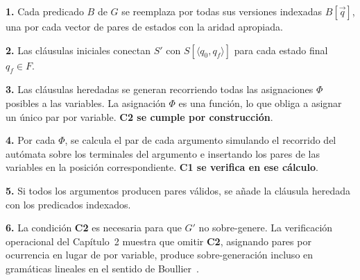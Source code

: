 \documentclass[11pt, letterpaper]{article}
\theoremstyle{definition}
\newcommand{\pair}[2]{\langle #1, #2 \rangle}
\begin{document}
\begin{tcolorbox}
\textbf{1.} Cada predicado $B$ de $G$ se reemplaza por todas sus versiones indexadas $B[\vec{q}]$, una por cada vector de pares de estados con la aridad apropiada. \medskip

\textbf{2.} Las cláusulas iniciales conectan $S'$ con $S[\pair{q_0}{q_f}]$ para cada estado final $q_f \in F$. \medskip

\textbf{3.} Las cláusulas heredadas se generan recorriendo todas las asignaciones $\Phi$ posibles a las variables. La asignación $\Phi$ es una función, lo que obliga a asignar un único par por variable. \textbf{C2 se cumple por construcción}. \medskip

\textbf{4.} Por cada $\Phi$, se calcula el par de cada argumento simulando el recorrido del autómata sobre los terminales del argumento e insertando los pares de las variables en la posición correspondiente. \textbf{C1 se verifica en ese cálculo}. \medskip

\textbf{5.} Si todos los argumentos producen pares válidos, se añade la cláusula heredada con los predicados indexados. \medskip

\textbf{6.} La condición \textbf{C2} es necesaria para que $G'$ no sobre-genere. La verificación operacional del Capítulo~2 muestra que omitir \textbf{C2}, asignando pares por ocurrencia en lugar de por variable, produce sobre-generación incluso en gramáticas lineales en el sentido de Boullier~\cite{REF}.
\end{tcolorbox}
\end{document}
